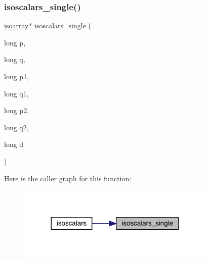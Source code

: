 \subsubsection{\texorpdfstring{isoscalars\_single()}{isoscalars\_single()}}
{\footnotesize\ttfamily \mbox{\hyperlink{classisoarray}{isoarray}}$\ast$ isoscalars\+\_\+single (\begin{DoxyParamCaption}\item[{long}]{p,  }\item[{long}]{q,  }\item[{long}]{p1,  }\item[{long}]{q1,  }\item[{long}]{p2,  }\item[{long}]{q2,  }\item[{long}]{d }\end{DoxyParamCaption})}

Here is the caller graph for this function\+:
\nopagebreak
\begin{figure}[H]
\begin{center}
\leavevmode
\includegraphics[width=269pt]{de/d9e/adat-devel_2lib_2SU3_2isoscalars_8cc_a79b9e82efcee0dcd9db337a918244131_icgraph}
\end{center}
\end{figure}
